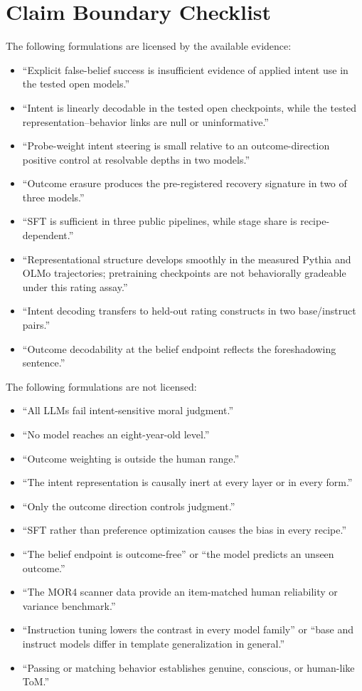 \section{Claim Boundary Checklist}

The following formulations are licensed by the available evidence:
\begin{itemize}[leftmargin=*]
    \item ``Explicit false-belief success is insufficient evidence of applied intent use in the tested open models.''
    \item ``Intent is linearly decodable in the tested open checkpoints, while the tested representation--behavior links are null or uninformative.''
    \item ``Probe-weight intent steering is small relative to an outcome-direction positive control at resolvable depths in two models.''
    \item ``Outcome erasure produces the pre-registered recovery signature in two of three models.''
    \item ``SFT is sufficient in three public pipelines, while stage share is recipe-dependent.''
    \item ``Representational structure develops smoothly in the measured Pythia and OLMo trajectories; pretraining checkpoints are not behaviorally gradeable under this rating assay.''
    \item ``Intent decoding transfers to held-out rating constructs in two base/instruct pairs.''
    \item ``Outcome decodability at the belief endpoint reflects the foreshadowing sentence.''
\end{itemize}

The following formulations are not licensed:
\begin{itemize}[leftmargin=*]
    \item ``All LLMs fail intent-sensitive moral judgment.''
    \item ``No model reaches an eight-year-old level.''
    \item ``Outcome weighting is outside the human range.''
    \item ``The intent representation is causally inert at every layer or in every form.''
    \item ``Only the outcome direction controls judgment.''
    \item ``SFT rather than preference optimization causes the bias in every recipe.''
    \item ``The belief endpoint is outcome-free'' or ``the model predicts an unseen outcome.''
    \item ``The MOR4 scanner data provide an item-matched human reliability or variance benchmark.''
    \item ``Instruction tuning lowers the contrast in every model family'' or ``base and instruct models differ in template generalization in general.''
    \item ``Passing or matching behavior establishes genuine, conscious, or human-like ToM.''
\end{itemize}
